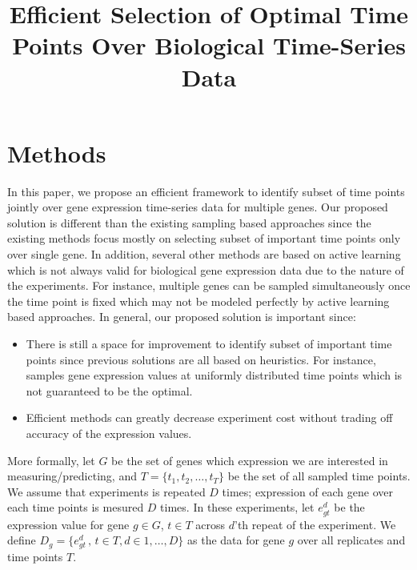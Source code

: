 \documentclass[10pt]{article}
\begin{document}
\title{Efficient Selection of Optimal Time Points Over Biological Time-Series Data}
\date{}

\maketitle

\section{Methods}

In this paper, we propose an efficient framework to identify subset of time points
jointly over gene expression time-series data for multiple genes. Our
proposed solution is different than the existing sampling based approaches since
the existing methods focus mostly on selecting subset of important time
points only over single gene. In addition, several other methods are
based on active learning which is not always valid for biological gene
expression data due to the nature of the experiments. For instance, multiple genes can be sampled simultaneously
once the time point is fixed which may not be modeled perfectly by
active learning based approaches. In general, our proposed solution is important since:
%
\begin{itemize}
\item There is still a space for improvement to identify subset of
  important time points since previous solutions are all based on heuristics. For
  instance,~\cite{bar2012} samples gene expression values at uniformly
  distributed time points which is not guaranteed to be the optimal. 
\vspace{0.05cm}
\item Efficient methods can greatly decrease experiment cost without
  trading off accuracy of the expression values. 
\end{itemize}
%
More formally, let $G$ be the set of genes which expression we are interested in
measuring/predicting, and $T = \{t_{1}, t_{2}, \ldots, t_{T}\}$ be the
set of all sampled time points. We assume that experiments is repeated
$D$ times; expression of each gene over each time points is mesured
$D$ times. In these experiments, let $e_{gt}^{d}$ be the expression value for gene $g \in G$, $t \in T$ across $d$'th repeat of
the experiment. We define $D_{g} = \{e_{gt}^{d}\,,\, t \in T, d \in 1,\ldots,D\}$ as the data for gene $g$ over all
replicates and time points $T$.
\end{document}

